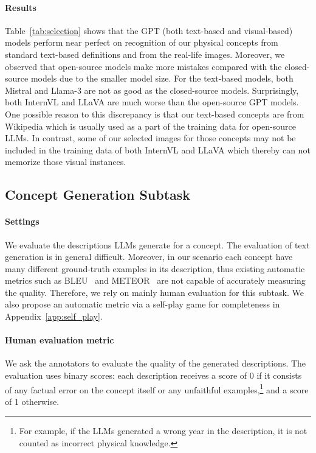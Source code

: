 \paragraph{Results} Table~\ref{tab:selection} shows that the GPT (both text-based and visual-based) models perform near perfect on 
recognition of our physical concepts from standard text-based definitions and from the real-life images.
Moreover, we observed that open-source models make more mistakes compared with the closed-source models due to the smaller model size. For the text-based models, both Mistral and Llama-3 are not as good as the closed-source models. Surprisingly, both InternVL and LLaVA are much worse than the open-source GPT models. One possible reason to this discrepancy is that our text-based concepts are from Wikipedia which is usually used as a part of the training data for open-source LLMs. In contrast, some of our selected images for those concepts may not be included in the training data of both InternVL and LLaVA which thereby can not memorize those visual instances. 


\subsection{Concept Generation Subtask}
\paragraph{Settings}
We evaluate the descriptions LLMs generate for a concept. 
The evaluation of text generation is in general difficult. Moreover, in our scenario each concept have many different ground-truth examples in its description, thus existing automatic metrics such as BLEU~\cite{papineni2002bleu} and METEOR~\cite{banerjee2005meteor} are not capable of accurately measuring the quality. 
Therefore, we rely on mainly human evaluation for this subtask. We also propose an automatic metric via a self-play game for completeness in Appendix~\ref{app:self_play}. 


\paragraph{Human evaluation metric} We ask the annotators to evaluate the quality of the generated descriptions. The evaluation uses binary scores: each description receives a score of 0 if it consists of any factual error on the concept itself
or any unfaithful examples,\footnote{For example, if the LLMs generated a wrong year in the description, it is not counted as incorrect physical knowledge.} 
and a score of 1 otherwise. %

